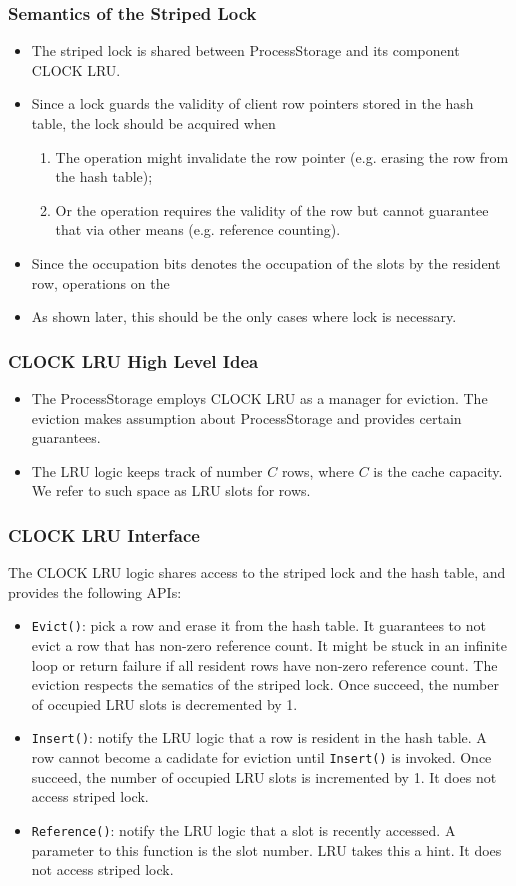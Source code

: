 \documentclass{beamer}
\begin{document}
\begin{frame}
\frametitle{Semantics of the Striped Lock}
\begin{itemize}
\item The striped lock is shared between ProcessStorage and its component CLOCK 
LRU.
\item Since a lock guards the validity of client row pointers stored in the hash
  table, the lock should be acquired when
\begin{enumerate}
\item The operation might invalidate the row pointer (e.g. erasing the row from 
  the hash table);
\item Or the operation requires the validity of the row but cannot guarantee that
via other means (e.g. reference counting).
\end{enumerate}
\item Since the occupation bits denotes the occupation of the slots by the resident
row, operations on the 
\item As shown later, this should be the only cases where lock is necessary.
\end{itemize}
\end{frame}

\begin{frame}
  \frametitle{CLOCK LRU High Level Idea}
\begin{itemize}
\item The ProcessStorage employs CLOCK LRU as a manager for eviction. The eviction makes 
assumption about ProcessStorage and provides certain guarantees.
\item The LRU logic keeps track of number $C$ rows, where $C$ is the cache capacity. We
refer to such space as LRU slots for rows. 
\end{itemize}
\end{frame}

\begin{frame}
\frametitle{CLOCK LRU Interface}
The CLOCK LRU logic shares access to the striped lock and the hash table, and 
provides the following APIs:

\begin{itemize}
\item \texttt{Evict()}: pick a row and erase it from the hash table. 
  It guarantees to not evict a row that has non-zero reference count. It might
  be stuck in an infinite loop or return failure if all resident rows have non-zero
  reference count. The eviction respects the sematics of the striped lock. Once
  succeed, the number of occupied LRU slots is decremented by 1.
\item \texttt{Insert()}: notify the LRU logic that a row is resident in the 
  hash table. A row cannot become a cadidate for eviction until \texttt{Insert()}
  is invoked. Once succeed, the number of occupied LRU slots is incremented by 1.
  It does not access striped lock.
\item \texttt{Reference()}: notify the LRU logic that a slot is recently accessed.
A parameter to this function is the slot number. LRU takes this a hint. It does 
not access striped lock.
\end{itemize}
\end{frame}
\end{document}
